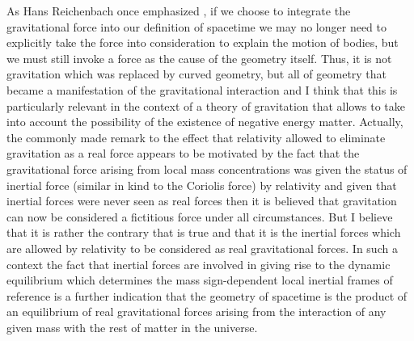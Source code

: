 \documentclass[notitlepage,12pt]{report}
\begin{document}
As Hans Reichenbach once emphasized \cite{Reichenbach-1}, if we choose to integrate the gravitational force into our definition of spacetime we may no longer need to explicitly take the force into consideration to explain the motion of bodies, but we must still invoke a force as the cause of the geometry itself. Thus, it is not gravitation which was replaced by curved geometry, but all of geometry that became a manifestation of the gravitational interaction and I think that this is particularly relevant in the context of a theory of gravitation that allows to take into account the possibility of the existence of negative energy matter. Actually, the commonly made remark to the effect that relativity allowed to eliminate gravitation as a real force appears to be motivated by the fact that the gravitational force arising from local mass concentrations was given the status of inertial force (similar in kind to the Coriolis force) by relativity and given that inertial forces were never seen as real forces then it is believed that gravitation can now be considered a fictitious force under all circumstances. But I believe that it is rather the contrary that is true and that it is the inertial forces which are allowed by relativity to be considered as real gravitational forces. In such a context the fact that inertial forces are involved in giving rise to the dynamic equilibrium which determines the mass sign-dependent local inertial frames of reference is a further indication that the geometry of spacetime is the product of an equilibrium of real gravitational forces arising from the interaction of any given mass with the rest of matter in the universe.

\bigskip
\end{document}
